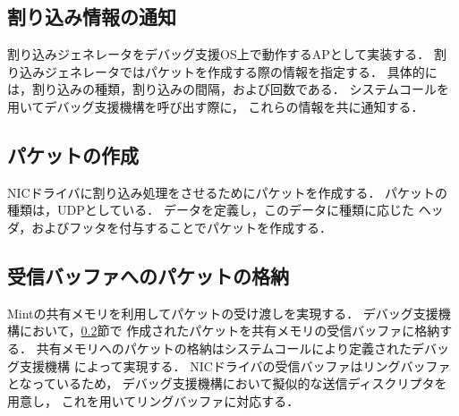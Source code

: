 \documentclass[tanilab-enum]{graduate}
\begin{document}
\subsection{割り込み情報の通知}
割り込みジェネレータをデバッグ支援OS上で動作するAPとして実装する．
割り込みジェネレータではパケットを作成する際の情報を指定する．
具体的には，割り込みの種類，割り込みの間隔，および回数である．
システムコールを用いてデバッグ支援機構を呼び出す際に，
これらの情報を共に通知する．

\subsection{パケットの作成}\label{packet}
NICドライバに割り込み処理をさせるためにパケットを作成する．
パケットの種類は，UDPとしている．
データを定義し，このデータに種類に応じた
ヘッダ，およびフッタを付与することでパケットを作成する．
\subsection{受信バッファへのパケットの格納}
Mintの共有メモリを利用してパケットの受け渡しを実現する．
デバッグ支援機構において，\ref{packet}節で
作成されたパケットを共有メモリの受信バッファに格納する．
共有メモリへのパケットの格納はシステムコールにより定義されたデバッグ支援機構
によって実現する．
NICドライバの受信バッファはリングバッファとなっているため，
デバッグ支援機構において擬似的な送信ディスクリプタを用意し，
これを用いてリングバッファに対応する．
\end{document}
